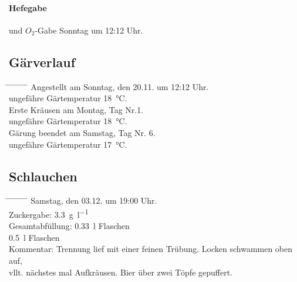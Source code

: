 \documentclass[12pt,oneside,a4paper]{scrartcl}
\begin{document}
\paragraph{Hefegabe} und $O_2$-Gabe Sonntag um 12:12 Uhr. 
\pagebreak[3]
\subsection*{Gärverlauf}
	\begin{tabbing}
		\hspace{1cm} \= \hspace{1cm} \= \hspace{1cm} \= \hspace{1cm} \= \hspace{1cm} \= \hspace{1cm} \= \hspace{1cm} \= \hspace{1cm} \= \kill
		\> Angestellt am Sonntag, den  20.11. um 12:12 Uhr.\\
		\> \> ungefähre Gärtemperatur \SI{18}{\celsius}.\\
		\> Erste Kräusen am Montag, Tag Nr.1.\\
		\> \> ungefähre Gärtemperatur \SI{18}{\celsius}.\\
		\> Gärung beendet am Samstag, Tag Nr. 6.\\
		\> \> ungefähre Gärtemperatur \SI{17}{\celsius}.
	\end{tabbing}
\pagebreak[3]
\subsection*{Schlauchen}
	\begin{tabbing}
		\hspace{1cm} \= \hspace{1cm} \= \hspace{1cm} \= \hspace{1cm} \= \hspace{1cm} \= \hspace{1cm} \= \hspace{1cm} \= \hspace{1cm} \= \kill
		\> Samstag, den 03.12. um 19:00 Uhr.\\
		\> Zuckergabe: \SI{3,3}{\gram\per\litre}\\
		\> Gesamtabfüllung: \> \> \> \> \SI{0,33}{\litre} Flaschen\\
		\> \> \> \> \> \SI{0,5}{\litre} Flaschen\\
		\> Kommentar: \>\>\> Trennung lief mit einer feinen Trübung. Locken schwammen oben auf,\\
		\>\>vllt. nächstes mal Aufkräusen. Bier über zwei Töpfe gepuffert.
	\end{tabbing}
%
\end{document}
